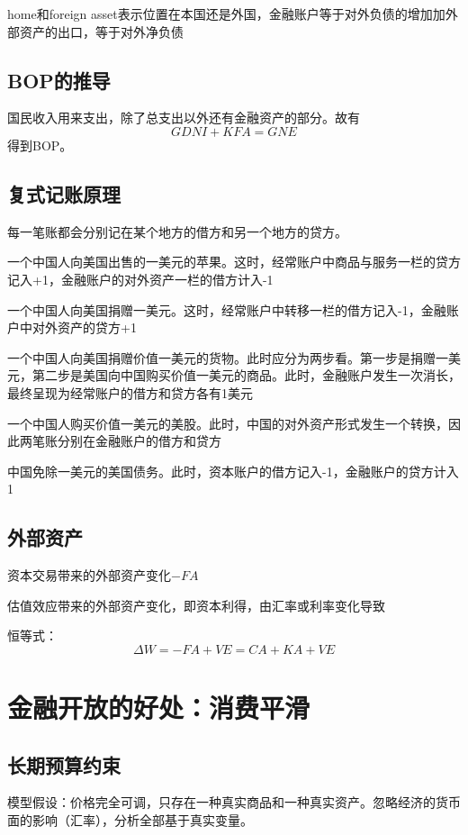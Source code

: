 \documentclass[a4paper, 10pt]{article}
\begin{document}
\noindent home和foreign asset表示位置在本国还是外国，金融账户等于对外负债的增加加外部资产的出口，等于对外净负债

\subsection{BOP的推导}
\noindent 国民收入用来支出，除了总支出以外还有金融资产的部分。故有
$$GDNI+KFA=GNE$$
得到BOP。
\subsection{复式记账原理}
\noindent 每一笔账都会分别记在某个地方的借方和另一个地方的贷方。


\noindent 一个中国人向美国出售的一美元的苹果。这时，经常账户中商品与服务一栏的贷方记入+1，金融账户的对外资产一栏的借方计入-1


\noindent 一个中国人向美国捐赠一美元。这时，经常账户中转移一栏的借方记入-1，金融账户中对外资产的贷方+1


\noindent 一个中国人向美国捐赠价值一美元的货物。此时应分为两步看。第一步是捐赠一美元，第二步是美国向中国购买价值一美元的商品。此时，金融账户发生一次消长，最终呈现为经常账户的借方和贷方各有1美元

\noindent 一个中国人购买价值一美元的美股。此时，中国的对外资产形式发生一个转换，因此两笔账分别在金融账户的借方和贷方

\noindent 中国免除一美元的美国债务。此时，资本账户的借方记入-1，金融账户的贷方计入1

\subsection{外部资产}
\noindent 资本交易带来的外部资产变化$-FA$

\noindent 估值效应带来的外部资产变化，即资本利得，由汇率或利率变化导致

\noindent 恒等式：
$$\Delta W=-FA+VE=CA+KA+VE$$

\section{金融开放的好处：消费平滑}

\subsection{长期预算约束}

\noindent 模型假设：价格完全可调，只存在一种真实商品和一种真实资产。忽略经济的货币面的影响（汇率），分析全部基于真实变量。
\end{document}
